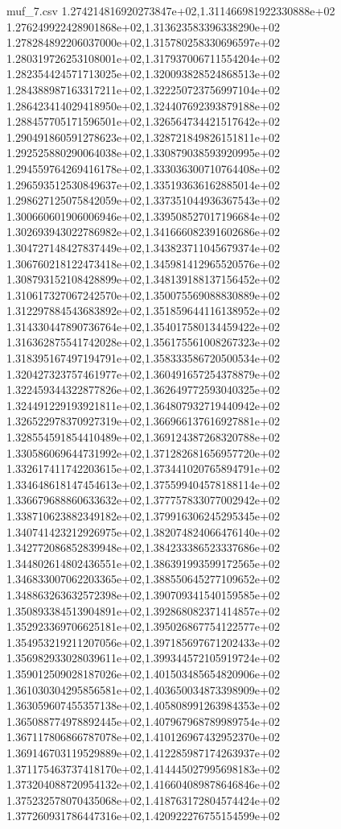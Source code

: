 \begin{filecontents*}{muf_7.csv}
1.274214816920273847e+02,1.311466981922330888e+02
1.276249922428901868e+02,1.313623583396338290e+02
1.278284892206037000e+02,1.315780258330696597e+02
1.280319726253108001e+02,1.317937006711554204e+02
1.282354424571713025e+02,1.320093828524868513e+02
1.284388987163317211e+02,1.322250723756997104e+02
1.286423414029418950e+02,1.324407692393879188e+02
1.288457705171596501e+02,1.326564734421517642e+02
1.290491860591278623e+02,1.328721849826151811e+02
1.292525880290064038e+02,1.330879038593920995e+02
1.294559764269416178e+02,1.333036300710764408e+02
1.296593512530849637e+02,1.335193636162885014e+02
1.298627125075842059e+02,1.337351044936367543e+02
1.300660601906006946e+02,1.339508527017196684e+02
1.302693943022786982e+02,1.341666082391602686e+02
1.304727148427837449e+02,1.343823711045679374e+02
1.306760218122473418e+02,1.345981412965520576e+02
1.308793152108428899e+02,1.348139188137156452e+02
1.310617327067242570e+02,1.350075569088830889e+02
1.312297884543683892e+02,1.351859644116138952e+02
1.314330447890736764e+02,1.354017580134459422e+02
1.316362875541742028e+02,1.356175561008267323e+02
1.318395167497194791e+02,1.358333586720500534e+02
1.320427323757461977e+02,1.360491657254378879e+02
1.322459344322877826e+02,1.362649772593040325e+02
1.324491229193921811e+02,1.364807932719440942e+02
1.326522978370927319e+02,1.366966137616927881e+02
1.328554591854410489e+02,1.369124387268320788e+02
1.330586069644731992e+02,1.371282681656957720e+02
1.332617411742203615e+02,1.373441020765894791e+02
1.334648618147454613e+02,1.375599404578188114e+02
1.336679688860633632e+02,1.377757833077002942e+02
1.338710623882349182e+02,1.379916306245295345e+02
1.340741423212926975e+02,1.382074824066476140e+02
1.342772086852839948e+02,1.384233386523337686e+02
1.344802614802436551e+02,1.386391993599172565e+02
1.346833007062203365e+02,1.388550645277109652e+02
1.348863263632572398e+02,1.390709341540159585e+02
1.350893384513904891e+02,1.392868082371414857e+02
1.352923369706625181e+02,1.395026867754122577e+02
1.354953219211207056e+02,1.397185697671202433e+02
1.356982933028039611e+02,1.399344572105919724e+02
1.359012509028187026e+02,1.401503485654820906e+02
1.361030304295856581e+02,1.403650034873398909e+02
1.363059607455357138e+02,1.405808991263984353e+02
1.365088774978892445e+02,1.407967968789989754e+02
1.367117806866787078e+02,1.410126967432952370e+02
1.369146703119529889e+02,1.412285987174263937e+02
1.371175463737418170e+02,1.414445027995698183e+02
1.373204088720954132e+02,1.416604089878646846e+02
1.375232578070435068e+02,1.418763172804574424e+02
1.377260931786447316e+02,1.420922276755154599e+02

\end{filecontents*}
